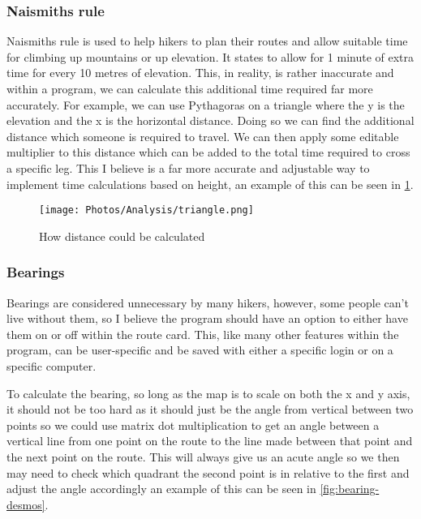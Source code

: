 \documentclass{article}
\begin{document}
        \subsubsection{Naismiths rule}
        \label{subsubsec:naismiths_rule}

            Naismiths rule is used to help hikers to plan their routes and allow suitable time for climbing up mountains or up elevation. It states to allow for 1 minute of extra time for every 10 metres of elevation. This, in reality, is rather inaccurate and within a program, we can calculate this additional time required far more accurately. For example, we can use Pythagoras on a triangle where the y is the elevation and the x is the horizontal distance. Doing so we can find the additional distance which someone is required to travel. We can then apply some editable multiplier to this distance which can be added to the total time required to cross a specific leg. This I believe is a far more accurate and adjustable way to implement time calculations based on height, an example of this can be seen in \cref{fig:inclined-distance}. 

            \begin{figure}[ht]
                \centering
                \texttt{[image: Photos/Analysis/triangle.png]}
                \caption{How distance could be calculated}
                \label{fig:inclined-distance}
            \end{figure}

        \subsubsection{Bearings}

            Bearings are considered unnecessary by many hikers, however, some people can't live without them, so I believe the program should have an option to either have them on or off within the route card. This, like many other features within the program, can be user-specific and be saved with either a specific login or on a specific computer. 

            To calculate the bearing, so long as the map is to scale on both the x and y axis, it should not be too hard as it should just be the angle from vertical between two points so we could use matrix dot multiplication to get an angle between a vertical line from one point on the route to the line made between that point and the next point on the route. This will always give us an acute angle so we then may need to check which quadrant the second point is in relative to the first and adjust the angle accordingly an example of this can be seen in \cref{fig:bearing-desmos}.
\end{document}
